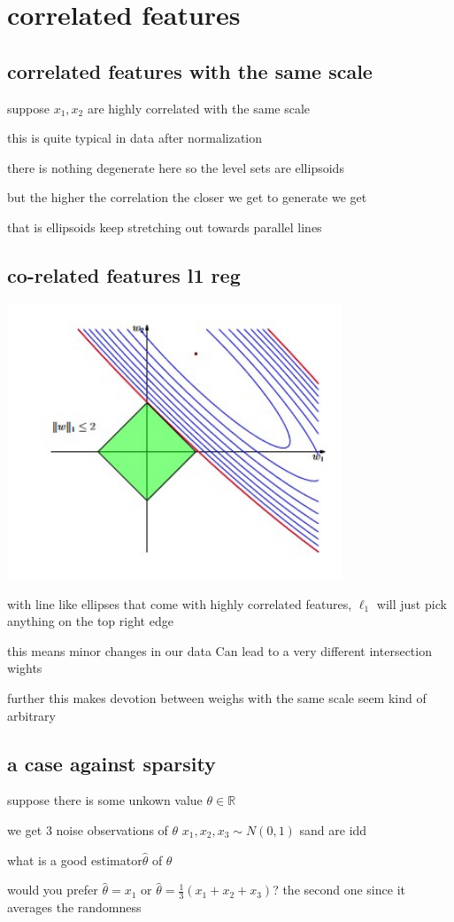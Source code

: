 \documentclass{article}
\begin{document}
\section{correlated features}
\subsection{correlated features with the same scale}
\item suppose $x_1, x_2$ are highly correlated with the same scale
\item this is quite typical in data after normalization 
\item there is nothing degenerate here so the level sets are ellipsoids
\item but the higher the correlation the closer we get to generate we get 
\item that is ellipsoids keep stretching out towards parallel lines
\subsection{co-related features l1 reg}
\item \includegraphics[width=10cm]{labs/lab_3/images/r3_5.jpg}
\item with line like ellipses that come with highly correlated features, $\ell_{1}$ will just pick anything on the top right edge
\item this means minor changes in our data Can lead to a very different intersection wights 
\item further this makes devotion between weighs with the same scale seem kind of arbitrary
\subsection{a case against sparsity}
\item suppose there is some unkown value $\theta \in \mathbb{R}$
\item we get 3 noise observations of $\theta$ $x_1,x_2,x_3 \sim N(0,1)$ sand are idd 
\item what is a good estimator$\hat{\theta}$ of $\theta$
\item would you prefer $\hat{\theta}=x_1$ or $\hat{\theta}=\frac{1}{3}(x_1+x_2+x_3)$? the second one since it averages the randomness
\end{document}
